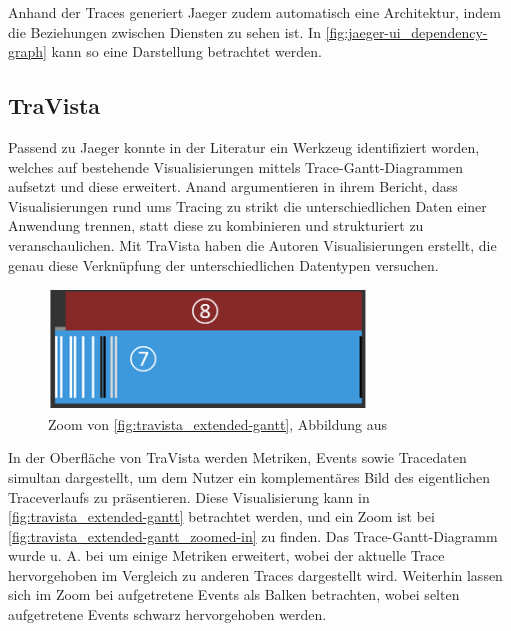 Anhand der Traces generiert Jaeger zudem automatisch eine Architektur, indem die Beziehungen zwischen Diensten zu sehen ist. In \autoref{fig:jaeger-ui_dependency-graph} kann so eine Darstellung betrachtet werden.

\subsection{TraVista}

Passend zu Jaeger konnte in der Literatur ein Werkzeug identifiziert worden, welches auf bestehende Visualisierungen mittels Trace-Gantt-Diagrammen aufsetzt und diese erweitert. Anand \etal \cite{TraVistaPaper} argumentieren in ihrem Bericht, dass Visualisierungen rund ums Tracing zu strikt die unterschiedlichen Daten einer Anwendung trennen, statt diese zu kombinieren und strukturiert zu veranschaulichen. Mit TraVista haben die Autoren Visualisierungen erstellt, die genau diese Verknüpfung der unterschiedlichen Datentypen versuchen.

\begin{figure}
\centering
\vspace{-1.5\baselineskip}
\includegraphics[width=\linewidth]{img/03_methoden/travista_extended-gantt_zoomed-in.png}
\caption{Zoom von \autoref{fig:travista_extended-gantt}, Abbildung aus \cite{TraVistaPaper}}
\label{fig:travista_extended-gantt_zoomed-in}
\end{figure}

In der Oberfläche von TraVista werden Metriken, Events sowie Tracedaten simultan dargestellt, um dem Nutzer ein komplementäres Bild des eigentlichen Traceverlaufs zu präsentieren. Diese Visualisierung kann in \autoref{fig:travista_extended-gantt} betrachtet werden, und ein Zoom ist bei \autoref{fig:travista_extended-gantt_zoomed-in} zu finden. Das Trace-Gantt-Diagramm wurde u. A. bei  um einige Metriken erweitert, wobei der aktuelle Trace hervorgehoben im Vergleich zu anderen Traces dargestellt wird. Weiterhin lassen sich im Zoom bei  aufgetretene Events als Balken betrachten, wobei selten aufgetretene Events schwarz hervorgehoben werden.

